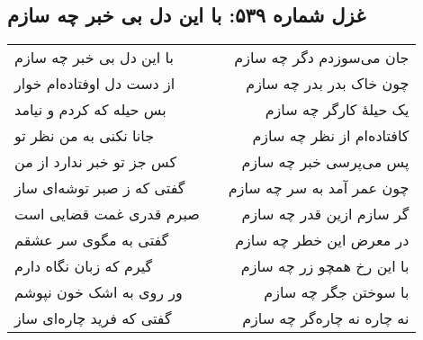 \begin{center}
\section*{غزل شماره ۵۳۹: با این دل بی خبر چه سازم}
\label{sec:539}
\begin{longtable}{l p{0.5cm} r}
با این دل بی خبر چه سازم
&&
جان می‌سوزدم دگر چه سازم
\\
از دست دل اوفتاده‌ام خوار
&&
چون خاک بدر بدر چه سازم
\\
بس حیله که کردم و نیامد
&&
یک حیلهٔ کارگر چه سازم
\\
جانا نکنی به من نظر تو
&&
کافتاده‌ام از نظر چه سازم
\\
کس جز تو خبر ندارد از من
&&
پس می‌پرسی خبر چه سازم
\\
گفتی که ز صبر توشه‌ای ساز
&&
چون عمر آمد به سر چه سازم
\\
صبرم قدری غمت قضایی است
&&
گر سازم ازین قدر چه سازم
\\
گفتی به مگوی سر عشقم
&&
در معرض این خطر چه سازم
\\
گیرم که زبان نگاه دارم
&&
با این رخ همچو زر چه سازم
\\
ور روی به اشک خون نپوشم
&&
با سوختن جگر چه سازم
\\
گفتی که فرید چاره‌ای ساز
&&
نه چاره نه چاره‌گر چه سازم
\\
\end{longtable}
\end{center}
